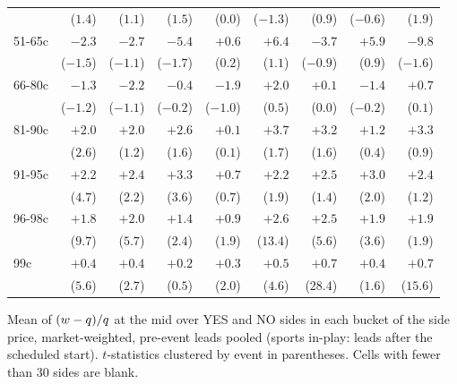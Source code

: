 \begin{table}[htbp]
\begin{threeparttable}
\begin{tabular}{@{}lrrrrrrrr@{}}
 & ($1.4$) & ($1.1$) & ($1.5$) & ($0.0$) & ($-1.3$) & ($0.9$) & ($-0.6$) & ($1.9$) \\[1pt]
51-65c & $-2.3$ & $-2.7$ & $-5.4$ & $+0.6$ & $+6.4$ & $-3.7$ & $+5.9$ & $-9.8$ \\
 & ($-1.5$) & ($-1.1$) & ($-1.7$) & ($0.2$) & ($1.1$) & ($-0.9$) & ($0.9$) & ($-1.6$) \\[1pt]
66-80c & $-1.3$ & $-2.2$ & $-0.4$ & $-1.9$ & $+2.0$ & $+0.1$ & $-1.4$ & $+0.7$ \\
 & ($-1.2$) & ($-1.1$) & ($-0.2$) & ($-1.0$) & ($0.5$) & ($0.0$) & ($-0.2$) & ($0.1$) \\[1pt]
81-90c & $+2.0$ & $+2.0$ & $+2.6$ & $+0.1$ & $+3.7$ & $+3.2$ & $+1.2$ & $+3.3$ \\
 & ($2.6$) & ($1.2$) & ($1.6$) & ($0.1$) & ($1.7$) & ($1.6$) & ($0.4$) & ($0.9$) \\[1pt]
91-95c & $+2.2$ & $+2.4$ & $+3.3$ & $+0.7$ & $+2.2$ & $+2.5$ & $+3.0$ & $+2.4$ \\
 & ($4.7$) & ($2.2$) & ($3.6$) & ($0.7$) & ($1.9$) & ($1.4$) & ($2.0$) & ($1.2$) \\[1pt]
96-98c & $+1.8$ & $+2.0$ & $+1.4$ & $+0.9$ & $+2.6$ & $+2.5$ & $+1.9$ & $+1.9$ \\
 & ($9.7$) & ($5.7$) & ($2.4$) & ($1.9$) & ($13.4$) & ($5.6$) & ($3.6$) & ($1.9$) \\[1pt]
99c & $+0.4$ & $+0.4$ & $+0.2$ & $+0.3$ & $+0.5$ & $+0.7$ & $+0.4$ & $+0.7$ \\
 & ($5.6$) & ($2.7$) & ($0.5$) & ($2.0$) & ($4.6$) & ($28.4$) & ($1.6$) & ($15.6$) \\[1pt]
\bottomrule
\end{tabular}
\begin{tablenotes}\footnotesize
\item Mean of $(w-q)/q$ at the mid over YES and NO sides in each bucket of the side price,
market-weighted, pre-event leads pooled (sports in-play: leads after the scheduled start).
$t$-statistics clustered by event in parentheses. Cells with fewer than 30 sides are blank.
\end{tablenotes}
\end{threeparttable}
\end{table}

